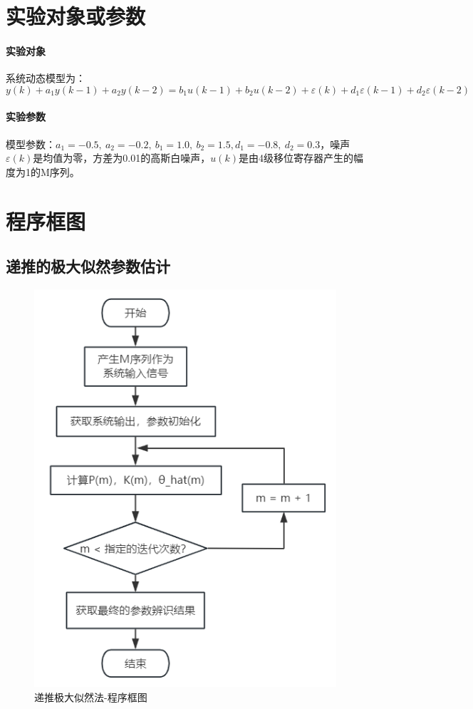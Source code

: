 \documentclass[UTF8]{article}
\begin{document}
%
\section{实验对象或参数}
\paragraph{实验对象}
系统动态模型为：
\begin{equation*}
    y(k) + a_1y(k-1) + a_2y(k-2) = b_1u(k-1) + b_2u(k-2) + \varepsilon(k) + d_1\varepsilon(k-1) + d_2\varepsilon(k-2)
\end{equation*}

\paragraph{实验参数}
模型参数：$a_1 = -0.5,\ a_2 = -0.2,\ b_1 = 1.0,\ b_2 = 1.5, d_1 = -0.8,\ d_2 = 0.3$，噪声$\varepsilon(k)$是均值为零，方差为0.01的高斯白噪声，$u(k)$是由4级移位寄存器产生的幅度为1的M序列。

%
\section{程序框图}
\subsection{递推的极大似然参数估计}
\begin{figure}[H]
    \centering %
    \includegraphics[width=.6\textwidth]{figure/递推极大似然-程序框图.png} 
    \caption{递推极大似然法-程序框图} %
\end{figure}
\end{document}
